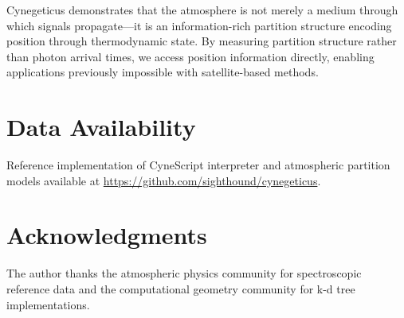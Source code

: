 \documentclass[twocolumn,10pt,a4paper]{article}
\theoremstyle{definition}
\theoremstyle{remark}
\begin{document}
Cynegeticus demonstrates that the atmosphere is not merely a medium through which signals propagate—it is an information-rich partition structure encoding position through thermodynamic state. By measuring partition structure rather than photon arrival times, we access position information directly, enabling applications previously impossible with satellite-based methods.

\section*{Data Availability}

Reference implementation of CyneScript interpreter and atmospheric partition models available at \url{https://github.com/sighthound/cynegeticus}.

\section*{Acknowledgments}

The author thanks the atmospheric physics community for spectroscopic reference data and the computational geometry community for k-d tree implementations.
\end{document}
